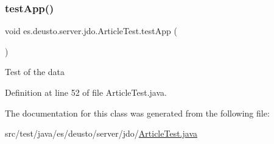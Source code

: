 \subsubsection{\texorpdfstring{test\+App()}{testApp()}}
{\footnotesize\ttfamily void es.\+deusto.\+server.\+jdo.\+Article\+Test.\+test\+App (\begin{DoxyParamCaption}{ }\end{DoxyParamCaption})}

Test of the data 

Definition at line 52 of file Article\+Test.\+java.



The documentation for this class was generated from the following file\+:\begin{DoxyCompactItemize}
\item 
src/test/java/es/deusto/server/jdo/\hyperlink{_article_test_8java}{Article\+Test.\+java}\end{DoxyCompactItemize}
